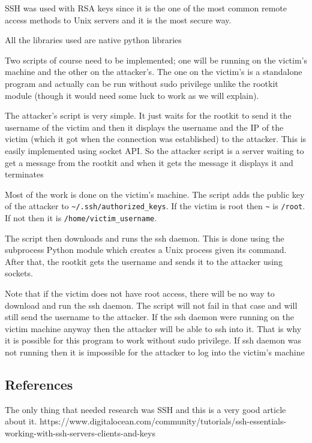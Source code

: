 \documentclass[12pt]{article}
\begin{document}
 SSH was used with RSA keys since it is the one of the most common remote access methods to Unix servers and it is the most secure way.
 
 All the libraries used are native python libraries
 
 Two scripts of course need to be implemented; one will be running on the victim's machine and the other on the attacker's. The one on the victim's is a standalone program and actually can be run without sudo privilege unlike the rootkit module (though it would need some luck to work as we will explain).
 
 The attacker's script is very simple. It just waits for the rootkit to send it the username of the victim and then it displays the username and the IP of the victim (which it got when the connection was established) to the attacker. This is easily implemented using socket API. So the attacker script is a server waiting to get a message from the rootkit and when it gets the message it displays it and terminates
 
 Most of the work is done on the victim's machine. The script adds the public key of the attacker to \lstinline{~/.ssh/authorized_keys}. If the victim is root then \lstinline{~} is \lstinline{/root}. If not then it is \lstinline{/home/victim_username}.
 
 The script then downloads and runs the ssh daemon. This is done using the subprocess Python module which creates a Unix process given its command. After that, the rootkit gets the username and sends it to the attacker using sockets.
 
 Note that if the victim does not have root access, there will be no way to download and run the ssh daemon. The script will not fail in that case and will still send the username to the attacker. If the ssh daemon were running on the victim machine anyway then the attacker will be able to ssh into it. That is why it is possible for this program to work without sudo privilege. If ssh daemon was not running then it is impossible for the attacker to log into the victim's machine
 
 \subsection{References}
 The only thing that needed research was SSH and this is a very good article about it.
 https://www.digitalocean.com/community/tutorials/ssh-essentials-working-with-ssh-servers-clients-and-keys
\end{document}
